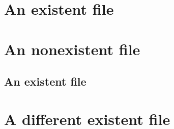 \section{An existent file}


\section{An nonexistent file}


\subsection{An existent file}


\section{A different existent file}


